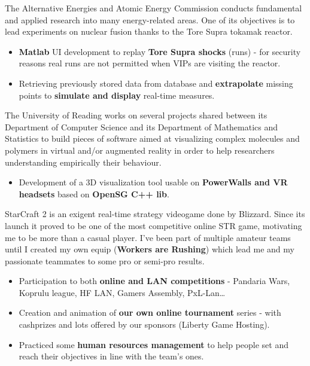 \documentclass[10pt, a4paper, ragged2e]{altacv}
\begin{document}
		The Alternative Energies and Atomic Energy Commission conducts fundamental and applied research into many energy-related areas. One of its objectives is to lead experiments on nuclear fusion thanks to the Tore Supra tokamak reactor.
		
		\medskip
		\begin{itemize}
			\item \textbf{Matlab} UI development to replay \textbf{Tore Supra shocks} (runs) - for security reasons real runs are not permitted when VIPs are visiting the reactor.
			\item Retrieving previously stored data from database and \textbf{extrapolate} missing points to \textbf{simulate and display} real-time measures.
		\end{itemize}
	\divider

		
		The University of Reading works on several projects shared between its Department of Computer Science and its Department of Mathematics and Statistics to build pieces of software aimed at visualizing complex molecules and polymers in virtual and/or augmented reality in order to help researchers understanding empirically their behaviour. 
		
		\medskip
		\begin{itemize}
			\item Development of a 3D visualization tool usable on \textbf{PowerWalls and VR headsets} based on \textbf{OpenSG C++ lib}.
		\end{itemize}

\bigskip
{}
	
		StarCraft 2 is an exigent real-time strategy videogame done by Blizzard. Since its launch it proved to be one of the most competitive online STR game, motivating me to be more than a casual player. I've been part of multiple amateur teams until I created my own equip (\textbf{Workers are Rushing}) which lead me and my passionate teammates to some pro or semi-pro results.

		\medskip
		\begin{itemize}
			\item Participation to both \textbf{online and LAN competitions} - Pandaria Wars, Koprulu league, HF LAN, Gamers Assembly, PxL-Lan\ldots
			\item Creation and animation of \textbf{our own online tournament} series - with cashprizes and lots offered by our sponsors (Liberty Game Hosting).
			\item Practiced some \textbf{human resources management} to help people set and reach their objectives in line with the team's ones.
		\end{itemize}
	\divider
\end{document}
